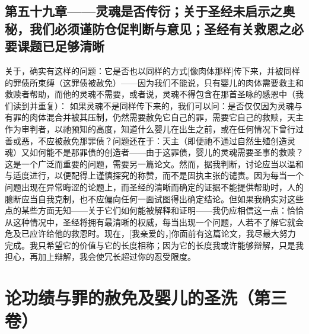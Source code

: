 
\subsection{第五十九章——灵魂是否传衍；关于圣经未启示之奥秘，我们必须谨防仓促判断与意见；圣经有关救恩之必要课题已足够清晰}

关于，确实有这样的问题：它是否也以同样的方式[像肉体那样]传下来，并被同样的罪债所束缚（这罪债被赦免）——因为我们不能说，只有婴儿的肉体需要救主和救赎者帮助，而他的灵魂不需要，或者说，灵魂不得包含在那首圣咏的感恩中（我们读到并重复）： 如果灵魂不是同样传下来的，我们可以问：是否仅仅因为灵魂与有罪的肉体混合并被其压制，仍然需要赦免它自己的罪，需要它自己的救赎，天主作为审判者，以祂预知的高度，知道什么婴儿在出生之前，或在任何情况下曾行过善或恶，不应被赦免那罪债？问题还在于：天主（即便祂不通过自然生殖创造灵魂）又如何能不是那罪债的创造者——由于这罪债，婴儿的灵魂需要圣事的救赎？这是一个广泛而重要的问题，需要另一篇论文。然而，据我判断，讨论应当以温和与适度进行，以便配得上谨慎探究的称赞，而不是固执主张的谴责。因为每当一个问题出现在异常晦涩的论题上，而圣经的清晰而确定的证据不能提供帮助时，人的臆断应当自我克制，也不应偏向任何一面试图得出确定结论。但如果我确实对这些点的某些方面无知——关于它们如何能被解释和证明——我仍应相信这一点：恰恰从这种情况中，圣经将拥有最清晰的权威，每当出现一个问题，人若不了解它就会危及已应许给他的救恩时。现在，[我亲爱的，]你面前有这篇论文，我尽最大努力完成。我只希望它的价值与它的长度相称；因为它的长度我或许能够辩解，只是我担心，再加上辩解，我会使冗长超过你的忍受限度。\par



\section{论功绩与罪的赦免及婴儿的圣洗（第三卷）}

\par

